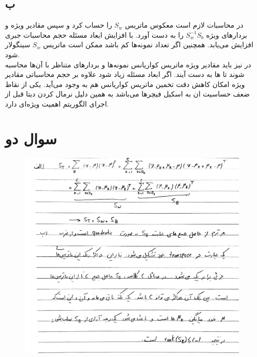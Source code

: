 \documentclass[12pt,onecolumn,a4paper]{article}
\begin{document}
\subsection*{ب}
در محاسبات  لازم است معکوس ماتریس $S_w$ را حساب کرد و سپس مقادیر ویژه و بردارهای ویژه $S_{w}^{-1}S_{b}$ را به دست آورد. با افزایش ابعاد مسئله حجم محاسبات جبری افزایش می‌یابد. همچنین اگر تعداد نمونه‌ها کم باشد ممکن است ماتریس $S_{w}$ سینگولار شود.
\\
در  نیز باید مقادیر ویژه ماتریس کواریانس نمونه‌ها و بردارهای متناظر با آن‌ها محاسبه شوند تا ها به دست آیند. اگر ابعاد مسئله زیاد شود علاوه بر حجم محاسباتی مقادیر ویژه امکان کاهش دقت تخمین ماتریس کواریانس هم به وجود می‌آید. یکی از نقاط ضعف  حساسیت ان به اسکیل فیچرها می‌باشد به همین دلیل نرمال کردن دیتا قبل از اجرای الگوریتم اهمیت ویژه‌ای دارد.
\\

\newpage
\section*{سوال دو}
\begin{figure}[h!]
    \begin{center}
    \includegraphics[width=\linewidth]{hand_written/2.jpg}
    \end{center}
\end{figure}

\newpage
\end{document}
